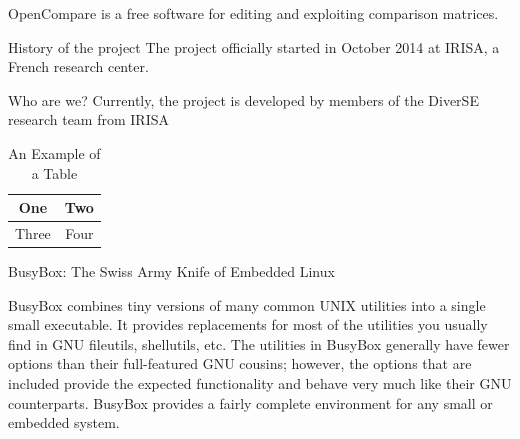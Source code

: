 \documentclass[10pt, conference, compsocconf]{IEEEtran}
\begin{document}
%

OpenCompare is a free software for editing and exploiting comparison matrices.

History of the project
The project officially started in October 2014 at IRISA, a French research center.

Who are we?
Currently, the project is developed by members of the DiverSE research team from IRISA





%
\begin{table}[!t]
\caption{An Example of a Table}
\label{table_example}
\centering
\begin{tabular}{|c||c|}
\hline
One & Two\\
\hline
Three & Four\\
\hline
\end{tabular}
\end{table}




BusyBox: The Swiss Army Knife of Embedded Linux

BusyBox combines tiny versions of many common UNIX utilities into a single small executable. It provides replacements for most of the utilities you usually find in GNU fileutils, shellutils, etc. The utilities in BusyBox generally have fewer options than their full-featured GNU cousins; however, the options that are included provide the expected functionality and behave very much like their GNU counterparts. BusyBox provides a fairly complete environment for any small or embedded system.
\end{document}
